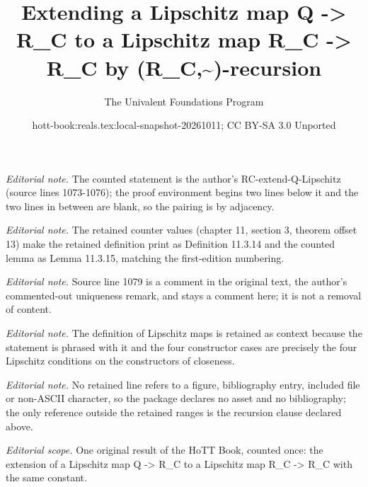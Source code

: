 \documentclass[10pt,a4paper]{article}
\title{Extending a Lipschitz map Q -> R\_C to a Lipschitz map R\_C -> R\_C by (R\_C,\textasciitilde{})-recursion}
\author{The Univalent Foundations Program}
\date{hott-book:reals.tex:local-snapshot-20261011; CC BY-SA 3.0 Unported}
\newcounter{chapter}
\theoremstyle{definition}
\theoremstyle{remark}
\numberwithin{equation}{section}
\begin{document}
\maketitle
\setcounter{chapter}{11}
\setcounter{section}{3}
\setcounter{thm}{13}
\noindent\textit{Editorial note.} The counted statement is the author's RC-extend-Q-Lipschitz (source lines 1073-1076); the proof environment begins two lines below it and the two lines in between are blank, so the pairing is by adjacency.\par\medskip
\noindent\textit{Editorial note.} The retained counter values (chapter 11, section 3, theorem offset 13) make the retained definition print as Definition 11.3.14 and the counted lemma as Lemma 11.3.15, matching the first-edition numbering.\par\medskip
\noindent\textit{Editorial note.} Source line 1079 is a comment in the original text, the author's commented-out uniqueness remark, and stays a comment here; it is not a removal of content.\par\medskip
\noindent\textit{Editorial note.} The definition of Lipschitz maps is retained as context because the statement is phrased with it and the four constructor cases are precisely the four Lipschitz conditions on the constructors of closeness.\par\medskip
\noindent\textit{Editorial note.} No retained line refers to a figure, bibliography entry, included file or non-ASCII character, so the package declares no asset and no bibliography; the only reference outside the retained ranges is the recursion clause declared above.\par\medskip
\noindent\textit{Editorial scope.} One original result of the HoTT Book, counted once: the extension of a Lipschitz map Q -> R\_C to a Lipschitz map R\_C -> R\_C with the same constant.\par\medskip
\end{document}
